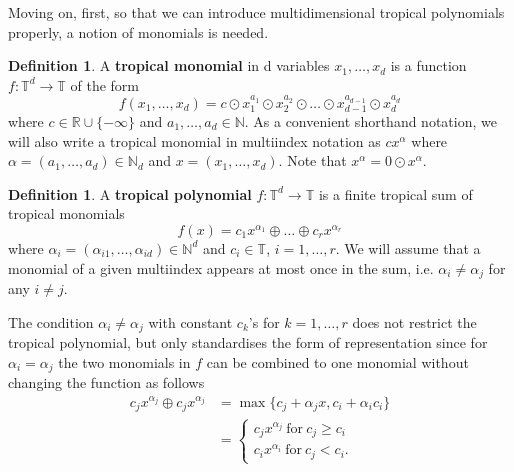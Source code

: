 \documentclass{article}
\theoremstyle{definition}
\newtheorem{definition}[theorem]{Definition}
\begin{document}
Moving on, first, so that we can introduce multidimensional tropical polynomials properly, a notion of monomials is needed.

\begin{definition}\hspace{1sp}\cite[p.~2]{zhang2018tropical}
A \textbf{tropical monomial} in d variables $x_1 , \dots , x_d$ is a function $ f: \mathbb{T}^{d} \to \mathbb{T} $ of the form 
$$f(x_1 , \dots , x_d) = c \odot x_1^{a_1} \odot x_2^{a_2} \odot \dots \odot x_{d-1}^{a_{d-1}} \odot x_d^{a_d}$$
where $c \in \mathbb{R} \cup \{- \infty \}$ and $a_1, \dots , a_d \in \mathbb{N}$. As a convenient shorthand notation, we will also write a tropical monomial in multiindex notation as $cx^{\alpha}$ where $\alpha = (a_1 , \dots , a_d) \in \mathbb{N}_d$ and $x = (x_1 , \dots , x_d)$. Note that $x^{\alpha} = 0 \odot x^{\alpha}$.
\end{definition}

\begin{definition}\hspace{1sp}\label{def:tropPolyn}\cite[p.~2]{zhang2018tropical}
A \textbf{tropical polynomial} $f: \mathbb{T}^{d} \to \mathbb{T}$ is a finite tropical sum of tropical monomials 
$$ f(x)=c_1x^{\alpha_1} \oplus \dots \oplus c_rx^{\alpha_r}$$
where $\alpha_i = (\alpha_{i1}, \dots , \alpha_{id}) \in \mathbb{N}^{d}$ and $c_i \in \mathbb{T}$, $i = 1, \dots , r$. We will assume that a monomial of a given multiindex appears at most once in the sum, i.e. $\alpha_i \neq \alpha_j$ for any $i \neq j$.
\end{definition}

The condition $\alpha_i \neq \alpha_j$ with constant $c_{k}$'s for $k=1, \dots , r$ does not restrict the tropical polynomial, but only standardises the form of representation since for $\alpha_{i} = \alpha_{j}$ the two monomials in $f$ can be combined to one monomial without changing the function as follows 
\begin{align*}
c_jx^{\alpha_j} \oplus c_jx^{\alpha_j} 
&= \max \{ c_{j} + \alpha_{j} x , c_{i} + \alpha_{i} c_{i} \} \\
&= \begin{cases} c_{j} x^{\alpha_{j}} \ \text{for} \ c_{j} \geq c_{i}\\
c_{i} x^{\alpha_{i}} \ \text{for} \ c_{j} < c_{i}.
\end{cases}
\end{align*}
\end{document}
